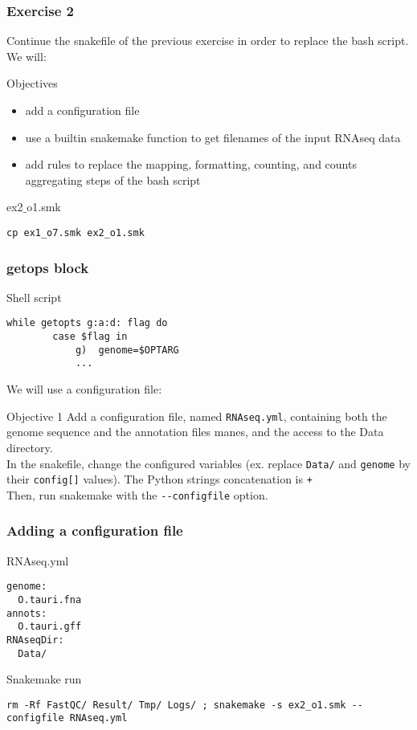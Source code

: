 \begin{frame}[containsverbatim]
\frametitle{Exercise 2}
Continue the snakefile of the previous exercise in order to replace the bash script. \\
We will:
\begin{exampleblock}{Objectives}
\begin{itemize}
    \item add a configuration file
    \item use a builtin snakemake function to get filenames of the input RNAseq data
    \item add rules to replace the mapping, formatting, counting, and counts aggregating steps of the bash script
\end{itemize}
\end{exampleblock}
\begin{exampleblock}{ex2$\_$o1.smk}
\begin{lstlisting}
cp ex1_o7.smk ex2_o1.smk
\end{lstlisting}
\end{exampleblock}
\end{frame}
\begin{frame}[containsverbatim]
\frametitle{getops block}
\begin{exampleblock}{Shell script}
\begin{lstlisting}
while getopts g:a:d: flag do
        case $flag in
            g)  genome=$OPTARG 
            ...
\end{lstlisting}
\end{exampleblock}
We will use a configuration file:
\begin{exampleblock}{Objective 1}
Add a configuration file, named \verb|RNAseq.yml|, containing both the genome sequence and the annotation files manes, and the access to the Data directory. \\
In the snakefile, change the configured variables (ex. replace \verb|Data/| and \verb|genome| by their \verb|config[]| values). The Python strings concatenation is \verb|+|\\
Then, run snakemake with the \verb|--configfile| option.
\end{exampleblock}
\end{frame}
\begin{frame}[containsverbatim]
\frametitle{Adding a configuration file}
\begin{exampleblock}{RNAseq.yml}
\begin{lstlisting}
genome:
  O.tauri.fna
annots:
  O.tauri.gff
RNAseqDir:
  Data/
\end{lstlisting}
\end{exampleblock}
\begin{exampleblock}{Snakemake run}
\begin{lstlisting}
rm -Rf FastQC/ Result/ Tmp/ Logs/ ; snakemake -s ex2_o1.smk --configfile RNAseq.yml
\end{lstlisting}
\end{exampleblock}
\end{frame}
